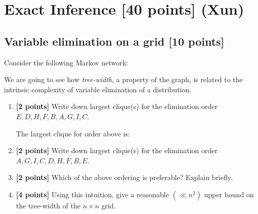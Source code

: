 \documentclass[12pt]{article}
\begin{document}
\newpage

\section{Exact Inference [40 points] (Xun)}

\subsection{Variable elimination on a grid [10 points]}

Consider the following Markov network:

\begin{figure}[h]
	\centering
\end{figure}


We are going to see how \emph{tree-width}, a property of the graph, is related to the intrinsic complexity of variable elimination of a distribution.


\begin{enumerate}

	\item \textbf{[2 points]} Write down largest clique(s) for the elimination order $ E, D, H, F, B, A, G, I, C $.

	      \begin{solution}
		      The largest clique for order above is:
	      \end{solution}


	\item \textbf{[2 points]} Write down largest clique(s) for the elimination order $ A, G, I, C, D, H, F, B, E $.



	\item \textbf{[2 points]} Which of the above ordering is preferable? Explain briefly.



	\item \textbf{[4 points]} Using this intuition, give a reasonable $ (\ll n^2) $ upper bound on the tree-width of the $ n \times n $ grid.



\end{enumerate}
\end{document}
